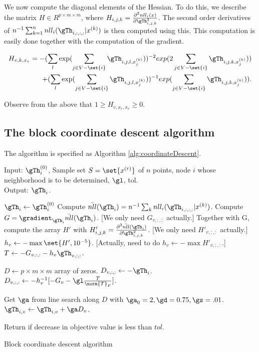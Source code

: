 \documentclass{article}
\begin{document}
We now compute the diagonal elements of the Hessian. To do this, we describe the matrix $H \in R^{p \times m \times m}$, where $H_{i, j, k} = \frac{\partial^{2} nll_i(x)}{\partial \gTh_{i, j, k}^{2}}$. The second order derivatives of $n^{-1} \sum_{k=1}^{n}nll_i(\gTh_{i, :, :, :} |x^{(k)})$ is then computed using this. This computation is easily done together with the computation of the gradient.

\begin{equation*}
\begin{split}
H_{v, k, x_v} = -(\sum_l \exp(\sum_{j \in V - \set{i}}\gTh_{i, j, l, x_j^{(k)}}))^{-2} exp(2\sum_{j \in V - \set{i}}\gTh_{i, j, k, x_j^{(k)}})) \\
+ (\sum_l \exp(\sum_{j \in V - \set{i}}\gTh_{i, j, l, x_j^{(k)}}))^{-1} exp(\sum_{j \in V - \set{i}}\gTh_{i, j, k, x_j^{(k)}})).
\end{split}
\end{equation*}

Observe from the above that $1 \geq H_{v, x_r, x_v} \geq 0$.

\subsection{The block coordinate descent algorithm}
The algorithm is specified as Algorithm \ref{alg:coordinateDescent}.

\begin{algorithm}[ht]
Input: $\gTh_i^{(0)}$, Sample set $S = \set{x^{(r)}}$ of $n$ points, node $i$ whose neighborhood is to be determined, $\gl$, tol.\\
Output: $\gTh_i$.\\
\begin{algorithmic}
\STATE $\gTh_i \gets \gTh_i^{(0)}$
\LOOP
{}
\STATE Compute $\bar{nll}(\gTh_i) = n^{-1}\sum_{k} nll_i(\gTh_{i, :, :, :}|x^{(k)})$.
\STATE Compute $G = \gradient_{\gTh_i} \bar{nll}(\gTh_i)$. [We only need $G_{v, :, :}$ actually.]
\STATE Together with G, compute the array $H'$ with $H'_{i, j, k} = \frac{\partial^{2} \bar{nll}(\gTh_i)}{\partial \gTh_{i, j, k}^{2}}$. [We only need $H'_{v, :, :}$ actually.]
\STATE $h_v \gets -\max \set{H', 10^{-5}}$. [Actually, need to do $h_v \gets -\max H'_{v, :, :}$.]
\STATE $T \gets -G_{v, :, :} - h_v \gTh_{v, :, :}$.

\STATE $D \gets p\times m \times m$ array of zeros.
\STATE $D_{v, :, :} \gets - \gTh_i$.
\ELSE
\STATE $D_{v, :, :} \gets - h_v^{-1}[-G_v - \gl \frac{T}{\norm{T}_F}]$.
\ENDIF

\STATE Get $\ga$ from line search along $D$ with $\ga_0 = 2, \gd = 0.75, \gs = .01$.
\STATE $\gTh_{i, v} \gets \gTh_{i, v} + \ga D_v$.
\ENDIF

\ENDFOR
\STATE Return if decrease in objective value is less than $tol$.
\ENDLOOP
\end{algorithmic}
\caption{Block coordinate descent algorithm}
\label{alg:coordinateDescent}
\end{algorithm}



\end{document}
